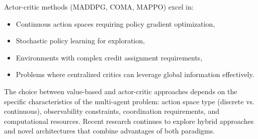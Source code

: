 Actor-critic methods (MADDPG, COMA, MAPPO) excel in:
\begin{itemize}
    \item Continuous action spaces requiring policy gradient optimization,
    \item Stochastic policy learning for exploration,
    \item Environments with complex credit assignment requirements,
    \item Problems where centralized critics can leverage global information effectively.
\end{itemize}

The choice between value-based and actor-critic approaches depends on the specific characteristics of the multi-agent problem: action space type (discrete vs. continuous), observability constraints, coordination requirements, and computational resources. Recent research continues to explore hybrid approaches and novel architectures that combine advantages of both paradigms.
